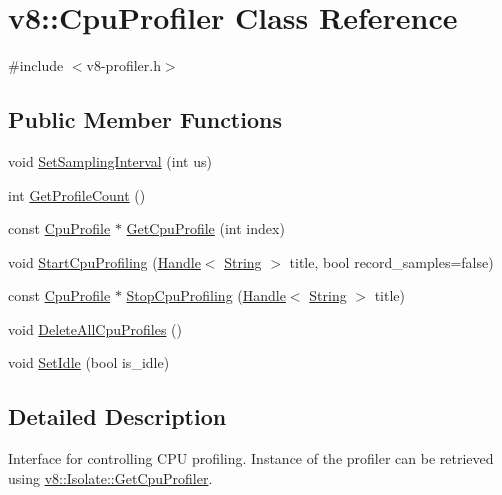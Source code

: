 \hypertarget{classv8_1_1_cpu_profiler}{}\section{v8\+:\+:Cpu\+Profiler Class Reference}
\label{classv8_1_1_cpu_profiler}


{\ttfamily \#include $<$v8-\/profiler.\+h$>$}

\subsection*{Public Member Functions}
\begin{DoxyCompactItemize}
\item 
void \hyperlink{classv8_1_1_cpu_profiler_ac5b05c72fb899e20adfa7f8cc57f21fb}{Set\+Sampling\+Interval} (int us)
\item 
int \hyperlink{classv8_1_1_cpu_profiler_af49a7c17dfdb194c8bbe2351519575d7}{Get\+Profile\+Count} ()
\item 
const \hyperlink{classv8_1_1_cpu_profile}{Cpu\+Profile} $\ast$ \hyperlink{classv8_1_1_cpu_profiler_a9f5b321b225ec9941290207cdd880ffb}{Get\+Cpu\+Profile} (int index)
\item 
void \hyperlink{classv8_1_1_cpu_profiler_a61b2b49010708f0283c1613e2bdc1adc}{Start\+Cpu\+Profiling} (\hyperlink{classv8_1_1_handle}{Handle}$<$ \hyperlink{classv8_1_1_string}{String} $>$ title, bool record\+\_\+samples=false)
\item 
const \hyperlink{classv8_1_1_cpu_profile}{Cpu\+Profile} $\ast$ \hyperlink{classv8_1_1_cpu_profiler_a531059626e708481ecb721a41a82a016}{Stop\+Cpu\+Profiling} (\hyperlink{classv8_1_1_handle}{Handle}$<$ \hyperlink{classv8_1_1_string}{String} $>$ title)
\item 
void \hyperlink{classv8_1_1_cpu_profiler_a73bc2fff59e78276025772a8380dc2ab}{Delete\+All\+Cpu\+Profiles} ()
\item 
void \hyperlink{classv8_1_1_cpu_profiler_a68e6da6f9ff4a0d3bde505f378a9a7fa}{Set\+Idle} (bool is\+\_\+idle)
\end{DoxyCompactItemize}


\subsection{Detailed Description}
Interface for controlling C\+P\+U profiling. Instance of the profiler can be retrieved using \hyperlink{classv8_1_1_isolate_a7eb415d9210d912aa57877ab6416fec8}{v8\+::\+Isolate\+::\+Get\+Cpu\+Profiler}. 

